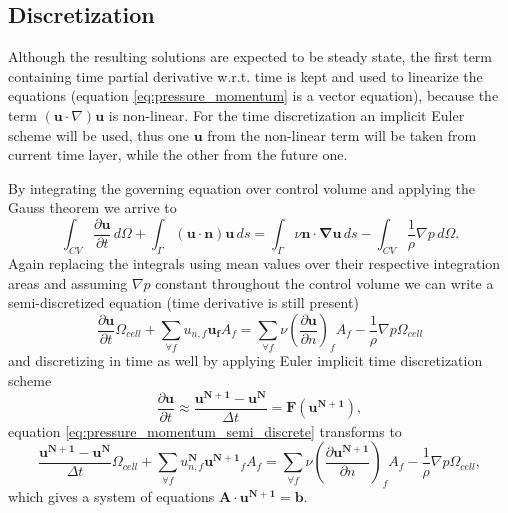 \documentclass[]{article}
\begin{document}
\subsection{Discretization}

Although the resulting solutions are expected to be steady state, the first term containing time partial derivative w.r.t. time is kept and used to linearize the equations (equation \ref{eq:pressure_momentum} is a vector equation), because the term $ (\mathbf{u} \cdot \nabla)\mathbf{u} $ is non-linear. For the time discretization an implicit Euler scheme will be used, thus one $ \mathbf{u} $ from the non-linear term will be taken from current time layer, while the other from the future one.

By integrating the governing equation over control volume and applying the Gauss theorem we arrive to 
\begin{equation}\label{eq:pressure_momentum_integral}
\int_{CV} \dfrac{\partial \mathbf{u}}{\partial t} \, d\Omega + \int_{\Gamma} (\mathbf{u\cdot n})\mathbf{u} \, ds = \int_{\Gamma} \nu \mathbf{n \cdot \nabla u} \, ds - \int_{CV} \dfrac{1}{\rho}\nabla p \, d \Omega.
\end{equation}
Again replacing the integrals using mean values over their respective integration areas and assuming $ \nabla p $ constant throughout the control volume we can write a semi-discretized equation (time derivative is still present) 
\begin{equation}\label{eq:pressure_momentum_semi_discrete}
\dfrac{\partial \mathbf{u}}{\partial t} \Omega_{cell} + \sum_{\forall f} u_{n,f} \mathbf{u_f} A_f = \sum_{\forall f}\nu \left(\dfrac{\partial \mathbf{u}}{\partial n}\right)_f A_f - \dfrac{1}{\rho} \nabla p \Omega_{cell}
\end{equation}
and discretizing in time as well by applying Euler implicit time discretization scheme
\begin{equation}
 \dfrac{\partial \mathbf{u}}{\partial t} \approx \dfrac{\mathbf{u^{N+1} - u^{N} }}{\Delta t} = \mathbf{F(u^{N+1})},
\end{equation} 
equation \ref{eq:pressure_momentum_semi_discrete} transforms to
\begin{equation}
\dfrac{\mathbf{u^{N+1} - u^{N} }}{\Delta t} \Omega_{cell}+ \sum_{\forall f} u_{n,f}^{\mathbf{N}} \mathbf{u^{N+1}}_f A_f = \sum_{\forall f}\nu \left(\dfrac{\partial \mathbf{u^{N+1}}}{\partial n}\right)_f A_f - \dfrac{1}{\rho} \nabla p \Omega_{cell},
\end{equation}
which gives a system of equations $ \mathbf{A}\cdot\mathbf{u^{N+1}} = \mathbf{b} $.
\end{document}
